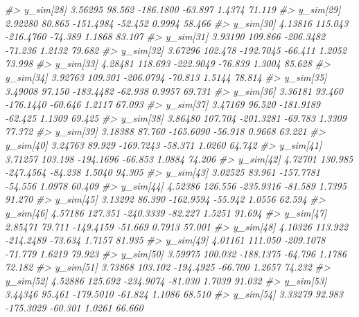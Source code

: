 \documentclass[
  10pt,
  italian,
  a4paper,
  extrafontsizes,onecolumn,openright
  ]{memoir}
\newenvironment{Shaded}{\begin{snugshade}}{\end{snugshade}}
\newcommand{\CommentTok}[1]{\textcolor[rgb]{0.56,0.35,0.01}{\textit{#1}}}
\begin{document}
\begin{Shaded}
\begin{Highlighting}[]
\CommentTok{\#\textgreater{}   y\_sim[28]   3.56295  98.562 {-}186.1800 {-}63.897  1.4374  71.119}
\CommentTok{\#\textgreater{}   y\_sim[29]   2.92280  80.865 {-}151.4984 {-}52.452  0.9994  58.466}
\CommentTok{\#\textgreater{}   y\_sim[30]   4.13816 115.043 {-}216.4760 {-}74.389  1.1868  83.107}
\CommentTok{\#\textgreater{}   y\_sim[31]   3.93190 109.866 {-}206.3482 {-}71.236  1.2132  79.682}
\CommentTok{\#\textgreater{}   y\_sim[32]   3.67296 102.478 {-}192.7045 {-}66.411  1.2052  73.998}
\CommentTok{\#\textgreater{}   y\_sim[33]   4.28481 118.693 {-}222.9049 {-}76.839  1.3004  85.628}
\CommentTok{\#\textgreater{}   y\_sim[34]   3.92763 109.301 {-}206.0794 {-}70.813  1.5144  78.814}
\CommentTok{\#\textgreater{}   y\_sim[35]   3.49008  97.150 {-}183.4482 {-}62.938  0.9957  69.731}
\CommentTok{\#\textgreater{}   y\_sim[36]   3.36181  93.460 {-}176.1440 {-}60.646  1.2117  67.093}
\CommentTok{\#\textgreater{}   y\_sim[37]   3.47169  96.520 {-}181.9189 {-}62.425  1.1309  69.425}
\CommentTok{\#\textgreater{}   y\_sim[38]   3.86480 107.704 {-}201.3281 {-}69.783  1.3309  77.372}
\CommentTok{\#\textgreater{}   y\_sim[39]   3.18388  87.760 {-}165.6090 {-}56.918  0.9668  63.221}
\CommentTok{\#\textgreater{}   y\_sim[40]   3.24763  89.929 {-}169.7243 {-}58.371  1.0260  64.742}
\CommentTok{\#\textgreater{}   y\_sim[41]   3.71257 103.198 {-}194.1696 {-}66.853  1.0884  74.206}
\CommentTok{\#\textgreater{}   y\_sim[42]   4.72701 130.985 {-}247.4564 {-}84.238  1.5040  94.305}
\CommentTok{\#\textgreater{}   y\_sim[43]   3.02525  83.961 {-}157.7781 {-}54.556  1.0978  60.409}
\CommentTok{\#\textgreater{}   y\_sim[44]   4.52386 126.556 {-}235.9316 {-}81.589  1.7395  91.270}
\CommentTok{\#\textgreater{}   y\_sim[45]   3.13292  86.390 {-}162.9594 {-}55.942  1.0556  62.594}
\CommentTok{\#\textgreater{}   y\_sim[46]   4.57186 127.351 {-}240.3339 {-}82.227  1.5251  91.694}
\CommentTok{\#\textgreater{}   y\_sim[47]   2.85471  79.711 {-}149.4159 {-}51.669  0.7913  57.001}
\CommentTok{\#\textgreater{}   y\_sim[48]   4.10326 113.922 {-}214.2489 {-}73.634  1.7157  81.935}
\CommentTok{\#\textgreater{}   y\_sim[49]   4.01161 111.050 {-}209.1078 {-}71.779  1.6219  79.923}
\CommentTok{\#\textgreater{}   y\_sim[50]   3.59975 100.032 {-}188.1375 {-}64.796  1.1786  72.182}
\CommentTok{\#\textgreater{}   y\_sim[51]   3.73868 103.102 {-}194.4925 {-}66.700  1.2657  74.232}
\CommentTok{\#\textgreater{}   y\_sim[52]   4.52886 125.692 {-}234.9074 {-}81.030  1.7039  91.032}
\CommentTok{\#\textgreater{}   y\_sim[53]   3.44346  95.461 {-}179.5010 {-}61.824  1.1086  68.510}
\CommentTok{\#\textgreater{}   y\_sim[54]   3.33279  92.983 {-}175.3029 {-}60.301  1.0261  66.660}

\end{Highlighting}
\end{Shaded}
\end{document}
